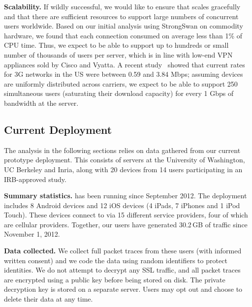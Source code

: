 \noindent\textbf{Scalability.} If wildly successful, we would like to
ensure that \meddle scales gracefully and that there are sufficient
resources to support large numbers of concurrent users
worldwide. Based on our initial analysis using StrongSwan on commodity
hardware, we found that each connection consumed on average less than
1\% of CPU time. Thus, we expect to be able to support up to hundreds or
small number of thousands of users per server, which is in line with
low-end VPN appliances sold by Cisco and Vyatta. A recent
study~\cite{pcworld-speedtests} showed that current rates for 3G
networks in the US were between 0.59 and 3.84 Mbps; assuming devices
are uniformly distributed across carriers, we expect to be able to
support 250 simultaneous users (saturating their download capacity)
for every 1 Gbps of bandwidth at the server.

\subsection{Current Deployment}
\label{subsec:currdeploy}
The analysis in the following sections relies on data gathered from 
our current prototype deployment. This consists of \meddle servers at the University of Washington, 
UC Berkeley and Inria, along with 20 devices from 14 users participating 
in an IRB-approved study. 

\noindent\textbf{Summary statistics.} \meddle has been running 
since September 2012. The deployment includes 8 Android devices 
and 12 iOS devices (4 iPads, 7 iPhones and 1 iPod Touch). These 
devices connect to \meddle via 15 different service providers, 
four of which are cellular providers. Together, our users have 
generated 30.2\,GB of traffic since November 1, 2012. 

\noindent\textbf{Data collected.}
We collect full packet traces from these users 
(with informed written consent) and we code the data using random identifiers 
to protect identities. We do not attempt to decrypt any SSL traffic, 
and all packet traces are encrypted using a public key before being 
stored on disk. The private decryption key is stored on a separate server. 
Users may opt out and choose to delete their data at any time. 



   

 
 
